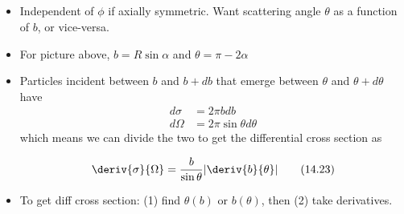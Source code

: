 \documentclass[10pt, twocolumn]{article}
\DeclareRobustCommand{\mybox}[2][gray!20]{%
	\begin{tcolorbox}[   %
		breakable,
		left=0pt,
		right=0pt,
		top=-13pt,
		bottom=0pt,
		colback=#1,
		colframe=#1,
		width=0.45\dimexpr\textwidth\relax,
		enlarge left by=0mm,
		boxsep=1pt,
		arc=0pt,outer arc=0pt,
		]
		#2
	\end{tcolorbox}
}
\newcommand\graybox[1]{ \mybox[gray!20]{\begin{align}#1\end{align}} }
\newcommand\myfig[2][0.3\textwidth]{\begin{figure}[h!]\centering\texttt{[image: \#2]}\end{figure}}
\newcommand\tlab[1]{\tag{#1}\label{#1}}
\begin{document}
\subsection{}
\begin{itemize}
\myfig{HardSphere.PNG}
\item Independent of $\phi$ if axially symmetric. Want scattering angle $\theta$ as a function of $b$, or vice-versa. 

\item For picture above, $b = R\sin\alpha$ and $\theta = \pi - 2\alpha$

\item Particles incident between $b$ and $b + db$ that emerge between $\theta$ and $\theta + d\theta$ have 
\begin{align}
	d\sigma &= 2\pi b db \tlab{14.21} \\
	d\Omega &= 2\pi \sin\theta d\theta \tlab{14.22}
\end{align}
which means we can divide the two to get the differential cross section as
\graybox{\deriv{\sigma}{\Omega} = \dfrac{b}{\sin\theta}|\deriv{b}{\theta}| \tlab{14.23}}

\item To get diff cross section: (1) find $\theta(b)$ or $b(\theta)$, then (2) take derivatives. 


\end{itemize}
\end{document}
